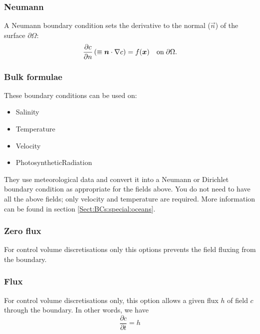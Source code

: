 \subsubsection{Neumann}

A Neumann boundary condition sets the derivative to the normal ($\vec n$) of the surface $\partial\Omega$:
\begin{equation*}
\frac{\partial c}{\partial n} \left(\equiv {\mbox{\boldmath$n$}}\cdot\nabla c\right) = f({\mbox{\boldmath$x$}}) \quad \textrm{on}\;  \partial\Omega.
\end{equation*}

\subsubsection{Bulk formulae}\label{Sect:bulk_formulae}

These boundary conditions can be used on:
\begin{itemize}
\item Salinity
\item Temperature
\item Velocity
\item PhotosyntheticRadiation
\end{itemize}

They use meteorological data and convert it into a Neumann or Dirichlet boundary condition
as appropriate for the fields above. You do not need to have all the above fields; only 
velocity and temperature are required. More information can be found in section \ref{Sect:BCs:special:oceans}.

\subsubsection{Zero flux}

For control volume discretisations only this options prevents the field fluxing from the boundary.

\subsubsection{Flux}

For control volume discretisations only, this option allows a given flux $h$ of field $c$ through the boundary. In other words, we have
\begin{equation*}
   \frac{\partial c}{\partial t} = h
\end{equation*}

